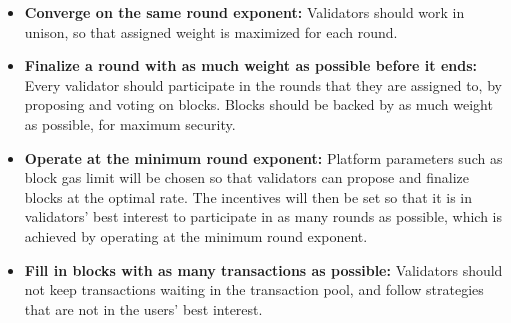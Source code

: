 \begin{itemize}
\item \textbf{Converge on the same round exponent:} Validators should work in unison, so that assigned weight is maximized for each round.
\item \textbf{Finalize a round with as much weight as possible before it ends:} Every validator should participate in the rounds that they are assigned to, by proposing and voting on blocks. Blocks should be backed by as much weight as possible, for maximum security.
\item \textbf{Operate at the minimum round exponent:} Platform parameters such as block gas limit will be chosen so that validators can propose and finalize blocks at the optimal rate. The incentives will then be set so that it is in validators' best interest to participate in as many rounds as possible, which is achieved by operating at the minimum round exponent.
\item \textbf{Fill in blocks with as many transactions as possible:} Validators should not keep transactions waiting in the transaction pool, and follow strategies that are not in the users' best interest.
\end{itemize}

